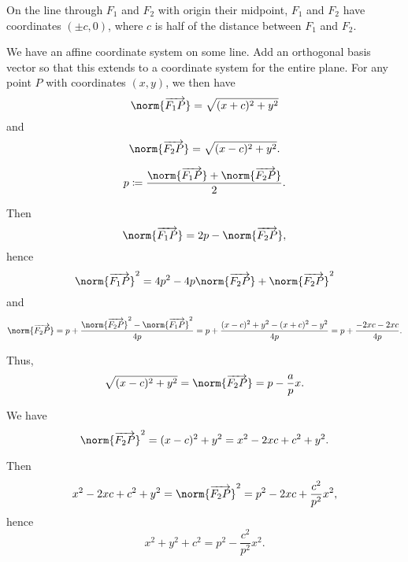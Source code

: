 \begin{defproof}
   On the line through \( F_1 \) and \( F_2 \) with origin their midpoint, \( F_1 \) and \( F_2 \) have coordinates \( (\pm c, 0) \), where \( c \) is half of the distance between \( F_1 \) and \( F_2 \).

  We have an affine coordinate system on some line. Add an orthogonal basis vector so that this extends to a coordinate system for the entire plane. For any point \( P \) with coordinates \( (x, y) \), we then have
  \begin{equation*}
    \norm{\vect{F_1 P}} = \sqrt{(x + c)^2 + y^2}
  \end{equation*}
  and
  \begin{equation*}
    \norm{\vect{F_2 P}} = \sqrt{(x - c)^2 + y^2}.
  \end{equation*}

  \begin{equation*}
    p \coloneqq \frac {\norm{\vect{F_1 P}} + \norm{\vect{F_2 P}}} 2.
  \end{equation*}

  Then
  \begin{equation*}
    \norm{\vect{F_1 P}} = 2p - \norm{\vect{F_2 P}},
  \end{equation*}
  hence
  \begin{equation*}
    \norm{\vect{F_1 P}}^2 = 4p^2 - 4p\norm{\vect{F_2 P}} + \norm{\vect{F_2 P}}^2
  \end{equation*}
  and
  \begin{equation*}
    \norm{\vect{F_2 P}}
    =
    p + \frac {\norm{\vect{F_2 P}}^2 - \norm{\vect{F_1 P}}^2} {4p}
    =
    p + \frac {(x - c)^2 + y^2 - (x + c)^2 - y^2} {4p}
    =
    p + \frac {-2xc - 2xc} {4p}.
  \end{equation*}

  Thus,
  \begin{equation*}
    \sqrt{(x - c)^2 + y^2} = \norm{\vect{F_2 P}} = p - \frac a p x.
  \end{equation*}

  We have
  \begin{equation*}
    \norm{\vect{F_2 P}}^2
    =
    (x - c)^2 + y^2
    =
    x^2 - 2xc + c^2 + y^2.
  \end{equation*}

  Then
  \begin{equation*}
    x^2 - 2xc + c^2 + y^2
    =
    \norm{\vect{F_2 P}}^2
    =
    p^2 - 2 x c + \frac {c^2} {p^2} x^2,
  \end{equation*}
  hence
  \begin{equation*}
    x^2 + y^2 + c^2 = p^2 - \frac {c^2} {p^2} x^2.
  \end{equation*}


\end{defproof}

